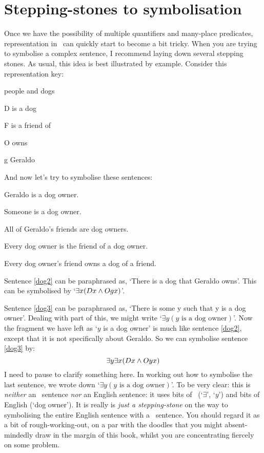\section{Stepping-stones to symbolisation}
Once we have the possibility of multiple quantifiers and many-place predicates, representation in \FOL\ can quickly start to become a bit tricky. When you are trying to symbolise a complex sentence, I recommend laying down several stepping stones. As usual, this idea is best illustrated by example. Consider this representation key:
\begin{ekey}
\item[\text{domain}] people and dogs
\item[D\meta{x}]  is a dog
\item[F\meta{xy}]  is a friend of 
\item[O\meta{xy}]  owns 
\item[g] Geraldo
\end{ekey}
And now let's try to symbolise these sentences:
\begin{earg}
\item[\ex{dog2}] Geraldo is a dog owner.
\item[\ex{dog3}] Someone is a dog owner.
\item[\ex{dog4}] All of Geraldo's friends are dog owners.
\item[\ex{dog5}] Every dog owner is the friend of a dog owner.
\item[\ex{dog6}] Every dog owner's friend owns a dog of a friend.
\end{earg}
Sentence \ref{dog2} can be paraphrased as, `There is a dog that Geraldo owns'. This can be symbolised by `$\exists x(Dx \wedge Ogx)$'.

Sentence \ref{dog3} can be paraphrased as, `There is some y such that y is a dog owner'. Dealing with part of this, we might write `$\exists y(y\text{ is a dog owner})$'. Now the fragment we have left as `$y$ is a dog owner' is much like sentence \ref{dog2}, except that it is not specifically about Geraldo. So we can symbolise sentence \ref{dog3} by:
$$\exists y \exists x(Dx \wedge Oyx)$$
I need to pause to clarify something here. In working out how to symbolise the last sentence, we wrote down `$\exists y(y\text{ is a dog owner})$'. To be very clear: this is \emph{neither} an \FOL\ sentence \emph{nor} an English sentence: it uses bits of \FOL\ (`$\exists$', `$y$') and bits of English (`dog owner'). It is really is \emph{just a stepping-stone} on the way to symbolising the entire English sentence with a \FOL\ sentence. You should regard it as a bit of rough-working-out, on a par with the doodles that you might absent-mindedly draw in the margin of this book, whilst you are concentrating fiercely on some problem.  

